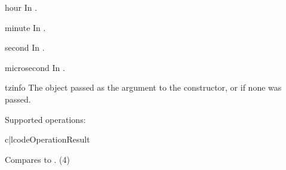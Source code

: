\begin{memberdesc}{hour}
  In .
\end{memberdesc}

\begin{memberdesc}{minute}
  In .
\end{memberdesc}

\begin{memberdesc}{second}
  In .
\end{memberdesc}

\begin{memberdesc}{microsecond}
  In .
\end{memberdesc}

\begin{memberdesc}{tzinfo}
  The object passed as the  argument to the
   constructor, or  if none was passed.
\end{memberdesc}

Supported operations:

\begin{tableii}{c|l}{code}{Operation}{Result}



   {Compares  to .
    (4)}

\end{tableii}

